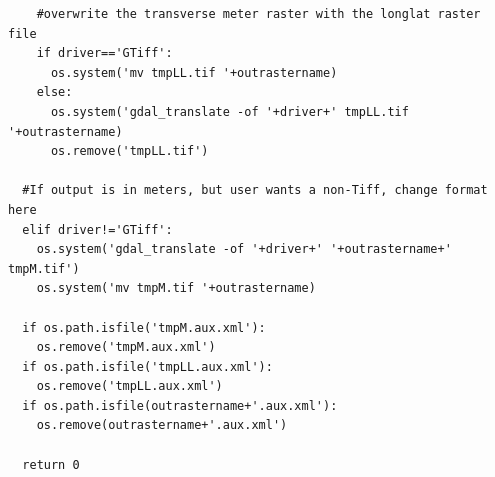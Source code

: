 \documentclass[12pt,letter]{article}
\begin{document}
\begin{verbatim}
    #overwrite the transverse meter raster with the longlat raster file
    if driver=='GTiff':
      os.system('mv tmpLL.tif '+outrastername)
    else:
      os.system('gdal_translate -of '+driver+' tmpLL.tif '+outrastername)
      os.remove('tmpLL.tif')
  
  #If output is in meters, but user wants a non-Tiff, change format here
  elif driver!='GTiff':
    os.system('gdal_translate -of '+driver+' '+outrastername+' tmpM.tif')
    os.system('mv tmpM.tif '+outrastername)
  
  if os.path.isfile('tmpM.aux.xml'):
    os.remove('tmpM.aux.xml')
  if os.path.isfile('tmpLL.aux.xml'):
    os.remove('tmpLL.aux.xml')
  if os.path.isfile(outrastername+'.aux.xml'):
    os.remove(outrastername+'.aux.xml')
  
  return 0
\end{verbatim}
\end{document}
